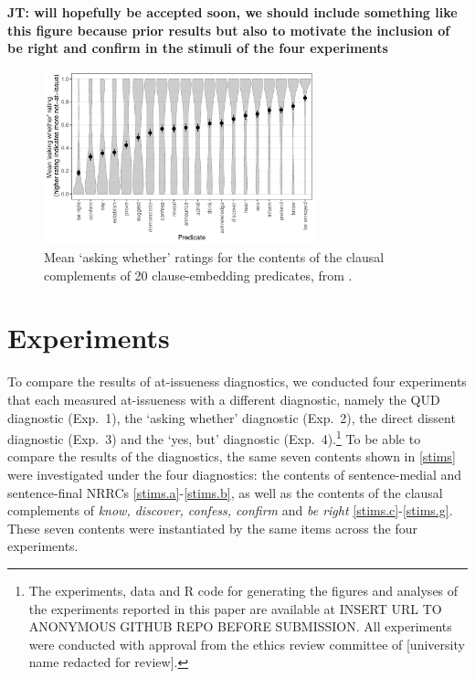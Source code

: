 \documentclass[times,linguex]{glossa}
\begin{document}
  {\bf JT: \citealt{degen-tonhauser-glossa} will hopefully be accepted soon, we should include something like this figure because prior results but also to motivate the inclusion of be right and confirm in the stimuli of the four experiments}
      
  \begin{figure}[h!]
    \centering

  \includegraphics[width=0.7\textwidth]{../../results/main/degen-tonhauser-glossa/graphs/mean-asking-whether-ratings.pdf}

    \caption{Mean `asking whether' ratings for the contents of the clausal complements of 20 clause-embedding predicates, from \citealt{degen-tonhauser-glossa}.}
    \label{fig:dtglossa}
    \end{figure}

\section{Experiments \label{sec:2_experiments}}

  To compare the results of at-issueness diagnostics, we conducted four experiments that each measured at-issueness with a different diagnostic, namely the QUD diagnostic (Exp.~1), the `asking whether' diagnostic (Exp.~2), the direct dissent diagnostic (Exp.~3) and the `yes, but' diagnostic (Exp.~4).\footnote{The experiments, data and R code for generating the figures and analyses of the experiments reported in this paper are available at INSERT URL TO ANONYMOUS GITHUB REPO BEFORE SUBMISSION. All experiments were conducted with approval from the ethics review committee of [university name redacted for review].} To be able to compare the results of the diagnostics, the same seven contents shown in \ref{stims} were investigated under the four diagnostics: the contents of sentence-medial and sentence-final NRRCs \ref{stims.a}-\ref{stims.b}, as well as the contents of the clausal complements of \emph{know, discover, confess, confirm} and \emph{be right} \ref{stims.c}-\ref{stims.g}. These seven contents were instantiated by the same items across the four experiments.
\end{document}
